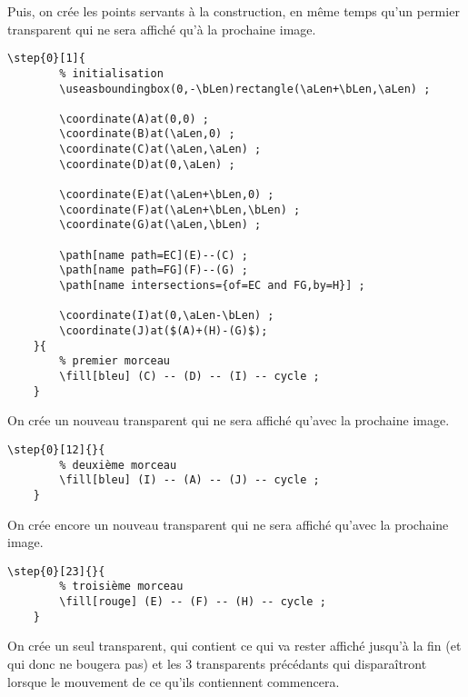 \documentclass[a4paper,12pt]{article}
\begin{document}
Puis, on crée les points servants à la construction, en même temps qu'un permier transparent qui ne sera affiché qu'à la prochaine image.
\begin{lstlisting}[name=exemplecomplet]
	\step{0}[1]{
		% initialisation 
		\useasboundingbox(0,-\bLen)rectangle(\aLen+\bLen,\aLen) ;
		
		\coordinate(A)at(0,0) ;
		\coordinate(B)at(\aLen,0) ;
		\coordinate(C)at(\aLen,\aLen) ;
		\coordinate(D)at(0,\aLen) ;

		\coordinate(E)at(\aLen+\bLen,0) ;
		\coordinate(F)at(\aLen+\bLen,\bLen) ;
		\coordinate(G)at(\aLen,\bLen) ;

		\path[name path=EC](E)--(C) ;
		\path[name path=FG](F)--(G) ;
		\path[name intersections={of=EC and FG,by=H}] ;

		\coordinate(I)at(0,\aLen-\bLen) ;
		\coordinate(J)at($(A)+(H)-(G)$);
	}{
		% premier morceau
		\fill[bleu] (C) -- (D) -- (I) -- cycle ;
	}
\end{lstlisting}

On crée un nouveau transparent qui ne sera affiché qu'avec la prochaine image.

\begin{lstlisting}[name=exemplecomplet]
	\step{0}[12]{}{
		% deuxième morceau
		\fill[bleu] (I) -- (A) -- (J) -- cycle ;
	}
\end{lstlisting}

On crée encore un nouveau transparent qui ne sera affiché qu'avec la prochaine image.

\begin{lstlisting}[name=exemplecomplet]
	\step{0}[23]{}{
		% troisième morceau
		\fill[rouge] (E) -- (F) -- (H) -- cycle ;
	}
\end{lstlisting}

On crée un seul transparent, qui contient ce qui va rester affiché jusqu'à la fin (et qui donc ne bougera pas) et les 3 transparents précédants qui disparaîtront lorsque le mouvement de ce qu'ils 
contiennent commencera.
\end{document}
